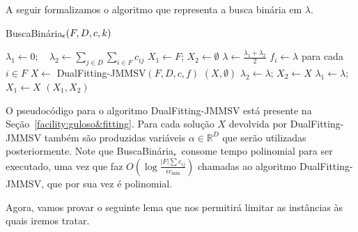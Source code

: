 A seguir formalizamos o algoritmo que representa a busca binária em $\lambda$.

\begin{algorithm}
    \caption{\sc BuscaBinária$_\epsilon(F,D,c,k)$}
    \label{bb}
    \begin{algorithmic}[1]
        \State $\lambda_1 \gets 0; \quad \lambda_2 \gets \sum_{j \in D}\sum_{i \in F}c_{ij} $
        \State $X_1 \gets F$; \quad $X_2 \gets \emptyset$
        \State $\lambda \gets \frac{\lambda_1 + \lambda_2}{2}$
        \State $f_i \gets \lambda$ para cada $i \in F$
        \State $X \gets$ {\sc DualFitting-JMMSV}$(F,D,c,f)$
        \State \Return $(X,\emptyset)$
        \State $\lambda_2 \gets \lambda$; \quad $X_2 \gets X$
        \Else
        \State $\lambda_1 \gets \lambda$;\quad$X_1 \gets X$
        \EndIf
        \EndWhile
        \State \Return $(X_1,X_2)$
    \end{algorithmic}
\end{algorithm}
O pseudocódigo para o algoritmo {\sc DualFitting-JMMSV} está presente na Seção~\ref{facility:guloso&fitting}. Para cada solução $X$ devolvida por {\sc DualFitting-JMMSV} também são produzidas variáveis $\alpha \in \mathbb{R}^D$ que serão utilizadas posteriormente. Note que {\sc BuscaBinária$_\epsilon$} consome tempo polinomial para ser executado, uma vez que faz $O(\log \frac{|F| \sum c_{ij}}{\epsilon c_{\min}})$ chamadas ao algoritmo {\sc DualFitting-JMMSV}, que por sua vez é polinomial.

Agora, vamos provar o seguinte lema que nos permitirá limitar as instâncias às quais iremos tratar.

